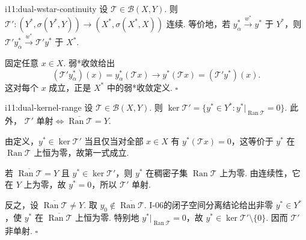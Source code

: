 \begin{FAProposition}{i11:dual-wstar-continuity}
设 \(\displaystyle \mathcal T\in\mathcal B(X,Y)\). 则
\(\displaystyle \mathcal T':(Y^*,\sigma(Y^*,Y))\to(X^*,\sigma(X^*,X))\)
连续. 等价地，若 \(\displaystyle y_\alpha^*\overset{w^*}{\longrightarrow}y^*\) 于 \(\displaystyle Y^*\)，则 \(\displaystyle \mathcal T'y_\alpha^*\overset{w^*}{\longrightarrow}\mathcal T'y^*\) 于 \(\displaystyle X^*\).
\end{FAProposition}

\begin{FAProof}
固定任意 \(\displaystyle x\in X\). 弱*收敛给出
\[
(\mathcal T'y_\alpha^*)(x)
=y_\alpha^*(\mathcal T x)
\longrightarrow
y^*(\mathcal T x)
=(\mathcal T'y^*)(x).
\]
这对每个 \(\displaystyle x\) 成立，正是 \(\displaystyle X^*\) 中的弱*收敛定义.
\hfill\(\square\)
\end{FAProof}

\begin{FALemma}[B][对偶算子的核与稠密值域]{i11:dual-kernel-range}
设 \(\displaystyle \mathcal T\in\mathcal B(X,Y)\). 则
\(\displaystyle \ker\mathcal T' = \{y^*\in Y^*:y^*|_{\operatorname{Ran}\mathcal T}=0\}\).
此外，
\(\displaystyle \mathcal T'\text{ 单射} \iff \overline{\operatorname{Ran}\mathcal T}=Y\).
\end{FALemma}

\begin{FAProof}
由定义，\(\displaystyle y^*\in\ker\mathcal T'\) 当且仅当对全部 \(\displaystyle x\in X\) 有 \(\displaystyle y^*(\mathcal T x)=0\)，这等价于 \(\displaystyle y^*\) 在 \(\displaystyle \operatorname{Ran}\mathcal T\) 上恒为零，故第一式成立.

若 \(\displaystyle \overline{\operatorname{Ran}\mathcal T}=Y\) 且 \(\displaystyle y^*\in\ker\mathcal T'\)，则 \(\displaystyle y^*\) 在稠密子集 \(\displaystyle \operatorname{Ran}\mathcal T\) 上为零. 由连续性，它在 \(\displaystyle Y\) 上为零，故 \(\displaystyle y^*=0\)，所以 \(\displaystyle \mathcal T'\) 单射.

反之，设 \(\displaystyle \overline{\operatorname{Ran}\mathcal T}\neq Y\). 取 \(\displaystyle y_0\notin\overline{\operatorname{Ran}\mathcal T}\). I-06的闭子空间分离结论给出非零 \(\displaystyle y^*\in Y^*\)，使 \(\displaystyle y^*\) 在 \(\displaystyle \overline{\operatorname{Ran}\mathcal T}\) 上恒为零. 特别地 \(\displaystyle y^*|_{\operatorname{Ran}\mathcal T}=0\)，故 \(\displaystyle y^*\in\ker\mathcal T'\setminus\{0\}\). 因而 \(\displaystyle \mathcal T'\) 非单射.
\hfill\(\square\)
\end{FAProof}

